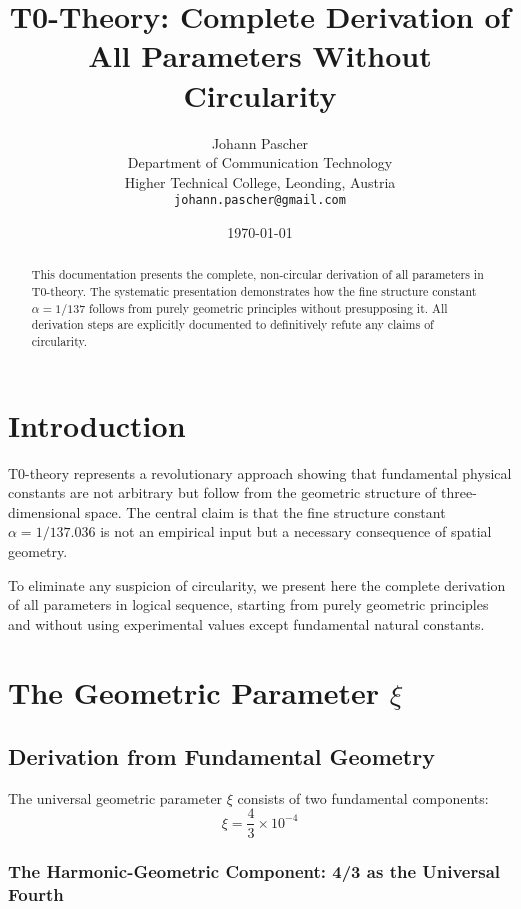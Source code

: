\documentclass[12pt,a4paper]{article}
\title{T0-Theory: Complete Derivation of All Parameters Without Circularity}
\author{Johann Pascher\\
	Department of Communication Technology\\
	Higher Technical College, Leonding, Austria\\
	\texttt{johann.pascher@gmail.com}}
\date{\today}
\begin{document}
	
	\maketitle
	
	\begin{abstract}
		This documentation presents the complete, non-circular derivation of all parameters in T0-theory. The systematic presentation demonstrates how the fine structure constant $\alpha = 1/137$ follows from purely geometric principles without presupposing it. All derivation steps are explicitly documented to definitively refute any claims of circularity.
	\end{abstract}

	
	\section{Introduction}
	
	T0-theory represents a revolutionary approach showing that fundamental physical constants are not arbitrary but follow from the geometric structure of three-dimensional space. The central claim is that the fine structure constant $\alpha = 1/137.036$ is not an empirical input but a necessary consequence of spatial geometry.
	
	To eliminate any suspicion of circularity, we present here the complete derivation of all parameters in logical sequence, starting from purely geometric principles and without using experimental values except fundamental natural constants.
\tableofcontents
\newpage	
\section{The Geometric Parameter $\xi$}

\subsection{Derivation from Fundamental Geometry}

The universal geometric parameter $\xi$ consists of two fundamental components:
\begin{equation}
	\xi = \frac{4}{3} \times 10^{-4}
\end{equation}

\subsubsection{The Harmonic-Geometric Component: 4/3 as the Universal Fourth}
\end{document}
